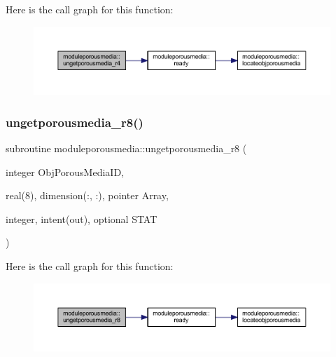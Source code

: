 Here is the call graph for this function\+:\nopagebreak
\begin{figure}[H]
\begin{center}
\leavevmode
\includegraphics[width=350pt]{namespacemoduleporousmedia_a90cbc92ae3cf9c9c828403c5fdc6c414_cgraph}
\end{center}
\end{figure}
\mbox{\label{namespacemoduleporousmedia_a4341a39680ae8538342f20cb21df9b6a}} 
\subsubsection{\texorpdfstring{ungetporousmedia\+\_\+r8()}{ungetporousmedia\_r8()}}
{\footnotesize\ttfamily subroutine moduleporousmedia\+::ungetporousmedia\+\_\+r8 (\begin{DoxyParamCaption}\item[{integer}]{Obj\+Porous\+Media\+ID,  }\item[{real(8), dimension(\+:, \+:), pointer}]{Array,  }\item[{integer, intent(out), optional}]{S\+T\+AT }\end{DoxyParamCaption})\hspace{0.3cm}{\ttfamily [private]}}

Here is the call graph for this function\+:\nopagebreak
\begin{figure}[H]
\begin{center}
\leavevmode
\includegraphics[width=350pt]{namespacemoduleporousmedia_a4341a39680ae8538342f20cb21df9b6a_cgraph}
\end{center}
\end{figure}
\mbox{\label{namespacemoduleporousmedia_a1ceb6ca7f8349192893a0bd63cf7403d}} 
